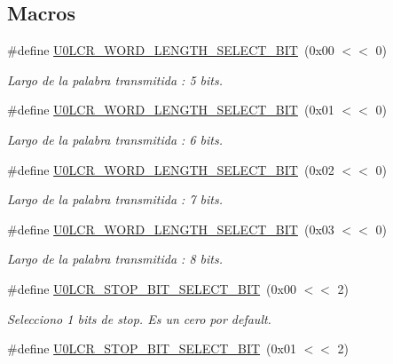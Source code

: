 \subsection*{Macros}
\begin{DoxyCompactItemize}
\item 
\#define \hyperlink{group___l_c_r_b_i_t_s_ga81ce767ec824bfc681ba09c07f5fa7f8}{U0\+L\+C\+R\+\_\+\+W\+O\+R\+D\+\_\+\+L\+E\+N\+G\+T\+H\+\_\+\+S\+E\+L\+E\+C\+T\+\_\+B\+IT}~(0x00 $<$$<$ 0)
\begin{DoxyCompactList}\small\item\em Largo de la palabra transmitida \+: 5 bits. \end{DoxyCompactList}\item 
\#define \hyperlink{group___l_c_r_b_i_t_s_ga22fa185de67e4fe6f1ee0f6c33d350f6}{U0\+L\+C\+R\+\_\+\+W\+O\+R\+D\+\_\+\+L\+E\+N\+G\+T\+H\+\_\+\+S\+E\+L\+E\+C\+T\+\_\+B\+IT}~(0x01 $<$$<$ 0)
\begin{DoxyCompactList}\small\item\em Largo de la palabra transmitida \+: 6 bits. \end{DoxyCompactList}\item 
\#define \hyperlink{group___l_c_r_b_i_t_s_ga2f83575d55d06ad71aa8e0acaa8c7c05}{U0\+L\+C\+R\+\_\+\+W\+O\+R\+D\+\_\+\+L\+E\+N\+G\+T\+H\+\_\+\+S\+E\+L\+E\+C\+T\+\_\+B\+IT}~(0x02 $<$$<$ 0)
\begin{DoxyCompactList}\small\item\em Largo de la palabra transmitida \+: 7 bits. \end{DoxyCompactList}\item 
\#define \hyperlink{group___l_c_r_b_i_t_s_gaec263e29a2f840e2a99c3aab0b244cf1}{U0\+L\+C\+R\+\_\+\+W\+O\+R\+D\+\_\+\+L\+E\+N\+G\+T\+H\+\_\+\+S\+E\+L\+E\+C\+T\+\_\+B\+IT}~(0x03 $<$$<$ 0)
\begin{DoxyCompactList}\small\item\em Largo de la palabra transmitida \+: 8 bits. \end{DoxyCompactList}\item 
\#define \hyperlink{group___l_c_r_b_i_t_s_gadb93dcea13ecddc341bf08bcbcfd5710}{U0\+L\+C\+R\+\_\+\+S\+T\+O\+P\+\_\+\+B\+I\+T\+\_\+\+S\+E\+L\+E\+C\+T\+\_\+B\+IT}~(0x00 $<$$<$ 2)
\begin{DoxyCompactList}\small\item\em Selecciono 1 bits de stop. Es un cero por default. \end{DoxyCompactList}\item 
\#define \hyperlink{group___l_c_r_b_i_t_s_ga2759f7645aa800c7685a05c10d0117aa}{U0\+L\+C\+R\+\_\+\+S\+T\+O\+P\+\_\+\+B\+I\+T\+\_\+\+S\+E\+L\+E\+C\+T\+\_\+B\+IT}~(0x01 $<$$<$ 2)

\end{DoxyCompactItemize}
